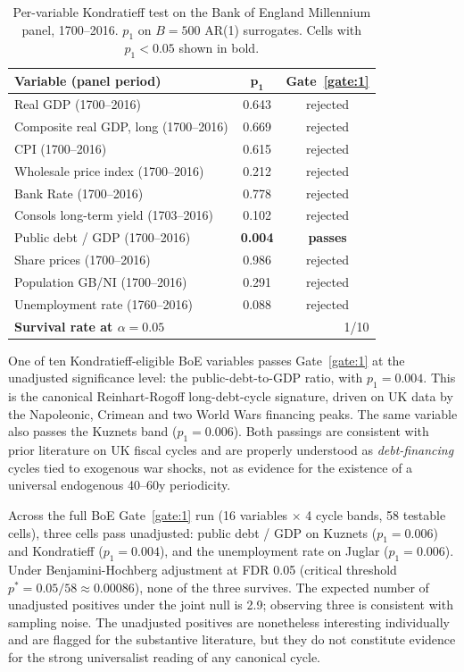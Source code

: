 \begin{table}[h]
\centering
\caption{Per-variable Kondratieff test on the Bank of England
Millennium panel, 1700--2016. \(p_1\) on \(B=500\) AR(1)
surrogates. Cells with \(p_1<0.05\) shown in bold.}
\label{tab:boe_kondratieff_p}
\small
\begin{tabularx}{\linewidth}{@{}X c c@{}}
\toprule
\textbf{Variable (panel period)} & \(\boldsymbol{p_1}\) & \textbf{Gate~\ref{gate:1}} \\
\midrule
Real GDP (1700--2016)                & 0.643 & rejected \\
Composite real GDP, long (1700--2016)& 0.669 & rejected \\
CPI (1700--2016)                     & 0.615 & rejected \\
Wholesale price index (1700--2016)   & 0.212 & rejected \\
Bank Rate (1700--2016)               & 0.778 & rejected \\
Consols long-term yield (1703--2016) & 0.102 & rejected \\
Public debt / GDP (1700--2016)       & \textbf{0.004} & \textbf{passes} \\
Share prices (1700--2016)            & 0.986 & rejected \\
Population GB/NI (1700--2016)        & 0.291 & rejected \\
Unemployment rate (1760--2016)       & 0.088 & rejected \\
\midrule
\textbf{Survival rate at \(\alpha=0.05\)} & \multicolumn{2}{r}{1/10} \\
\bottomrule
\end{tabularx}
\end{table}

One of ten Kondratieff-eligible BoE variables passes
Gate~\ref{gate:1} at the unadjusted significance level: the
public-debt-to-GDP ratio, with \(p_1=0.004\). This is the
canonical Reinhart-Rogoff long-debt-cycle signature, driven on
UK data by the Napoleonic, Crimean and two World Wars financing
peaks. The same variable also passes the Kuznets band
(\(p_1=0.006\)). Both passings are consistent with prior
literature on UK fiscal cycles
\citep{reinhart_rogoff2009} and are properly understood as
\emph{debt-financing} cycles tied to exogenous war shocks, not
as evidence for the existence of a universal endogenous 40--60y
periodicity.

Across the full BoE Gate~\ref{gate:1} run (16 variables \(\times\)
4 cycle bands, 58 testable cells), three cells pass unadjusted:
public debt / GDP on Kuznets (\(p_1=0.006\)) and Kondratieff
(\(p_1=0.004\)), and the unemployment rate on Juglar
(\(p_1=0.006\)). Under Benjamini-Hochberg adjustment at FDR
0.05 (critical threshold \(p^* = 0.05/58 \approx 0.00086\)),
none of the three survives. The expected number of unadjusted
positives under the joint null is 2.9; observing three is
consistent with sampling noise. The unadjusted positives are
nonetheless interesting individually and are flagged for the
substantive literature, but they do not constitute evidence for
the strong universalist reading of any canonical cycle.


